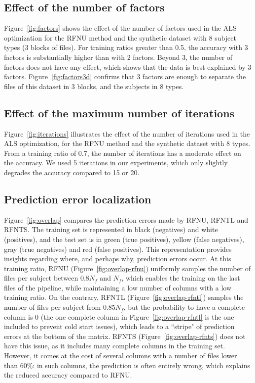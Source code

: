 \documentclass[10pt, conference, compsocconf]{IEEEtran}
\begin{document}
\subsection{Effect of the number of factors} Figure~\ref{fig:factors} 
shows the effect of the number of factors used in the ALS optimization 
for the RFNU method and the synthetic dataset with 8 subject types (3 
blocks of files). For training ratios greater than 0.5, the accuracy 
with 3 factors is substantially higher than with 2 factors. Beyond 3, 
the number of factors does not have any effect, which shows that the 
data is best 
explained by 3 factors. Figure~\ref{fig:factors3d} confirms that 3 
factors are enough to separate the files of this dataset in 3 
blocks, and the subjects in 8 types. \enlargethispage{5mm}

\subsection{Effect of the maximum number of iterations}
Figure~\ref{fig:iterations} illustrates the effect of the number of 
iterations used in the ALS optimization, for the 
RFNU method and the synthetic dataset with 8 types. 
From a training ratio of 0.7, the number of iterations has a moderate 
effect on the accuracy. We used 5 iterations in our experiments, 
which only slightly degrades the accuracy compared to 15 or 20.

\subsection{Prediction error localization}

Figure~\ref{fig:overlap} compares the prediction errors made by RFNU, 
RFNTL and RFNTS. The training set is represented
in black (negatives) and white (positives), and the test set is in green 
(true positives), yellow (false negatives), gray (true negatives) and 
red (false positives). This representation provides insights regarding 
where, and perhaps why, prediction errors 
occur. At this training ratio, RFNU (Figure~\ref{fig:overlap-rfnu}) 
uniformly samples the number of files per subject between 0.8$N_f$ and 
$N_f$, which enables the training on the last 
files of the pipeline, while maintaining a low number of columns with 
a low training ratio. On the contrary, RFNTL 
(Figure~\ref{fig:overlap-rfntl}) samples the number of files per 
subject from 0.85$N_f$, but the probability to have a complete column 
is 0 (the one complete column in Figure~\ref{fig:overlap-rfntl} is the 
one included to prevent cold start issues), which leads to a ``stripe" 
of prediction errors at the bottom of the matrix. RFNTS 
(Figure~\ref{fig:overlap-rfnts}) does not have this issue, as it 
includes many complete columns in the training set. However, it comes at 
the cost of several columns with a number of files lower than 
60\%: in such columns, the prediction is often entirely wrong, which explains
the reduced accuracy compared to RFNU.
\end{document}
